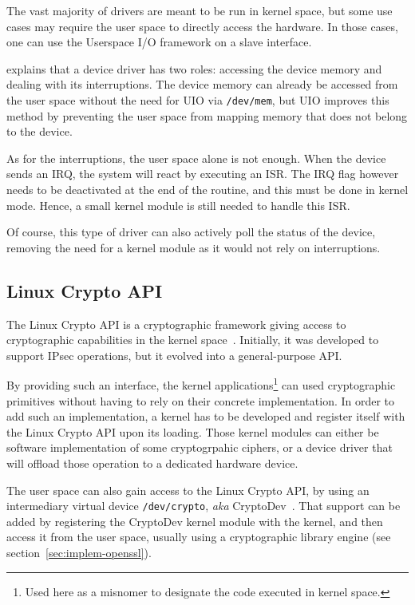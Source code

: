The vast majority of drivers are meant to be run in kernel space, but some use cases may require the user space to directly access the hardware.
In those cases, one can use the Userspace I/O framework on a slave interface.

\citet{koch2011} explains that a device driver has two roles: accessing the device memory and dealing with its interruptions.
The device memory can already be accessed from the user space without the need for UIO via \texttt{/dev/mem}, but UIO improves this method by preventing the user space from mapping memory that does not belong to the device.

\noindent As for the interruptions, the user space alone is not enough.
When the device sends an IRQ, the system will react by executing an ISR.
The IRQ flag however needs to be deactivated at the end of the routine, and this must be done in kernel mode.
Hence, a small kernel module is still needed to handle this ISR.

\noindent Of course, this type of driver can also actively poll the status of the device, removing the need for a kernel module as it would not rely on interruptions.


\subsection{Linux Crypto API}
The Linux Crypto API is a cryptographic framework giving access to cryptographic capabilities in the kernel space~\cite{morris2003}.
Initially, it was developed to support IPsec operations, but it evolved into a general-purpose API.

By providing such an interface, the kernel applications\footnote{Used here as a misnomer to designate the code executed in kernel space.} can used cryptographic primitives without having to rely on their concrete implementation.
In order to add such an implementation, a kernel has to be developed and register itself with the Linux Crypto API upon its loading.
Those kernel modules can either be software implementation of some cryptogrpahic ciphers, or a device driver that will offload those operation to a dedicated hardware device.\newline{}

The user space can also gain access to the Linux Crypto API, by using an intermediary virtual device \texttt{/dev/crypto}, \textit{aka} CryptoDev~\cite{cryptodev}.
That support can be added by registering the CryptoDev kernel module with the kernel, and then access it from the user space, usually using a cryptographic library engine (see section~\ref{sec:implem-openssl}).


